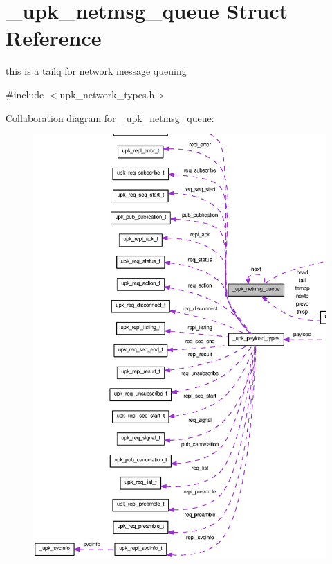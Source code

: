 \section{\_\-upk\_\-netmsg\_\-queue Struct Reference}
\label{struct__upk__netmsg__queue}


this is a tailq for network message queuing  




{\ttfamily \#include $<$upk\_\-network\_\-types.h$>$}



Collaboration diagram for \_\-upk\_\-netmsg\_\-queue:
\nopagebreak
\begin{figure}[H]
\begin{center}
\leavevmode
\includegraphics[width=400pt]{struct__upk__netmsg__queue__coll__graph}
\end{center}
\end{figure}
